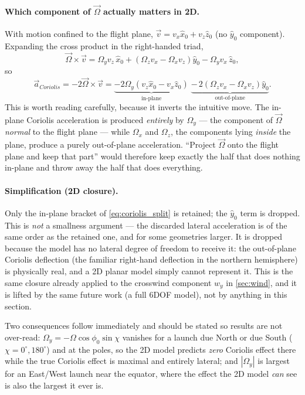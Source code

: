 \paragraph{Which component of $\vec{\Omega}$ actually matters in 2D.} With motion confined to the
flight plane, $\vec{v}=v_x\hat{x}_0+v_z\hat{z}_0$ (no $\hat{y}_0$ component). Expanding the cross
product in the right-handed triad,
\begin{equation}
    \vec{\Omega}\times\vec{v} =
        \Omega_yv_z\,\hat{x}_0
        + \left(\Omega_zv_x - \Omega_xv_z\right)\hat{y}_0
        - \Omega_yv_x\,\hat{z}_0,
\end{equation}
so
\begin{equation} \label{eq:coriolis_split}
    \vec{a}_{Coriolis} = -2\vec{\Omega}\times\vec{v} =
        \underbrace{-2\Omega_y\left(v_z\hat{x}_0 - v_x\hat{z}_0\right)}_{\text{in-plane}}
        \;\underbrace{-\,2\left(\Omega_zv_x - \Omega_xv_z\right)\hat{y}_0}_{\text{out-of-plane}}.
\end{equation}
This is worth reading carefully, because it inverts the intuitive move. The in-plane Coriolis
acceleration is produced \emph{entirely} by $\Omega_y$ --- the component of $\vec{\Omega}$
\emph{normal} to the flight plane --- while $\Omega_x$ and $\Omega_z$, the components lying
\emph{inside} the plane, produce a purely out-of-plane acceleration. ``Project $\vec{\Omega}$ onto
the flight plane and keep that part'' would therefore keep exactly the half that does nothing
in-plane and throw away the half that does everything.

\paragraph{Simplification (2D closure).} Only the in-plane bracket of \autoref{eq:coriolis_split}
is retained; the $\hat{y}_0$ term is dropped. This is \emph{not} a smallness argument --- the
discarded lateral acceleration is of the same order as the retained one, and for some geometries
larger. It is dropped because the model has no lateral degree of freedom to receive it: the
out-of-plane Coriolis deflection (the familiar right-hand deflection in the northern hemisphere) is
physically real, and a 2D planar model simply cannot represent it. This is the same closure already
applied to the crosswind component $w_y$ in \autoref{sec:wind}, and it is lifted by the same
future work (a full 6DOF model), not by anything in this section.

Two consequences follow immediately and should be stated so results are not over-read: $\Omega_y=
-\Omega\cos\phi_0\sin\chi$ vanishes for a launch due North or due South ($\chi=0^\circ,180^\circ$)
and at the poles, so the 2D model predicts \emph{zero} Coriolis effect there while the true
Coriolis effect is maximal and entirely lateral; and $|\Omega_y|$ is largest for an East/West
launch near the equator, where the effect the 2D model \emph{can} see is also the largest it ever
is.

